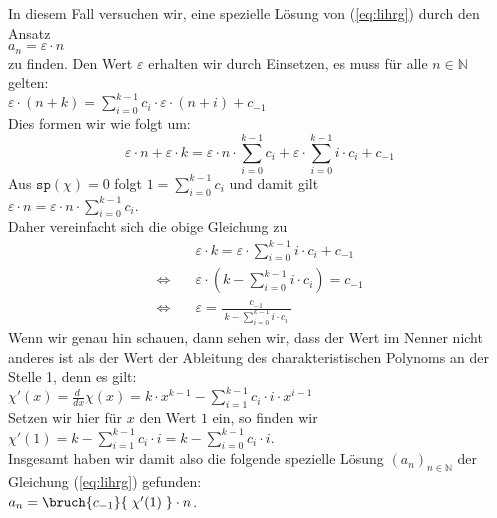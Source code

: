 \begin{enumerate}
      In diesem Fall versuchen wir, eine spezielle Lösung von (\ref{eq:lihrg}) durch den
      Ansatz \\[0.2cm]
      \hspace*{1.3cm} $a_n = \varepsilon \cdot n $ \\[0.2cm]
      zu finden.  Den Wert $\varepsilon$ erhalten wir durch Einsetzen, es muss für 
      alle $n\in\mathbb{N}$ gelten: \\[0.2cm]
      \hspace*{1.3cm} 
      $\varepsilon \cdot (n + k) = \sum\limits_{i=0}^{k-1} c_{i} \cdot \varepsilon \cdot (n + i) + c_{-1}$  
      \\[0.2cm]
      Dies formen wir wie folgt um:
      \[
        \varepsilon \cdot n + \varepsilon \cdot k = 
        \varepsilon \cdot n \cdot \sum\limits_{i=0}^{k-1} c_{i} +
        \varepsilon \cdot \sum\limits_{i=0}^{k-1} i \cdot c_{i} + c_{-1} 
      \]
      Aus  $\mathtt{sp}(\chi) = 0$ folgt $1  =  \sum\limits_{i=0}^{k-1} c_i$
      und damit gilt \\[0.2cm]
      \hspace*{1.3cm} 
      $\varepsilon \cdot n = \varepsilon \cdot n \cdot \sum\limits_{i=0}^{k-1} c_{i}$.
      \\[0.2cm]
      Daher vereinfacht sich die obige Gleichung zu 
      \[
      \begin{array}{ll}
      & \varepsilon \cdot k = \varepsilon \cdot \sum\limits_{i=0}^{k-1} i \cdot c_{i} + c_{-1} \\[0.4cm]
      \Leftrightarrow\quad 
      & \varepsilon \cdot \left(k - \sum\limits_{i=0}^{k-1} i \cdot c_{i}\right) = c_{-1} 
      \\[0.5cm]
      \Leftrightarrow\quad 
      & \varepsilon = \frac{\displaystyle c_{-1}}{\displaystyle \; k - \sum\limits_{i=0}^{k-1} i \cdot c_{i}\;} 
      \end{array}
      \]
      Wenn wir genau hin schauen, dann sehen wir, dass der Wert im Nenner nicht anderes ist
      als der Wert der Ableitung des charakteristischen Polynoms an der Stelle 1, denn es gilt: \\[0.2cm]
      \hspace*{1.3cm} 
      $\chi'(x) =\frac{d\;}{dx}\chi(x) = k \cdot x^{k-1} - \sum\limits_{i=1}^{k-1} c_{i}\cdot i \cdot x^{i-1}$
      \\[0.2cm]
      Setzen wir hier für $x$ den Wert $1$ ein, so finden wir \\[0.2cm]
      \hspace*{1.3cm} 
      $\chi'(1) = k - \sum\limits_{i=1}^{k-1} c_{i}\cdot i =  k - \sum\limits_{i=0}^{k-1} c_{i}\cdot i$. 
      \\[0.2cm]
      Insgesamt haben wir damit also die folgende spezielle Lösung $(a_n)_{n\in\mathbb{N}}$
      der Gleichung (\ref{eq:lihrg}) gefunden: \\[0.2cm]
      \hspace*{1.3cm} $a_n = \bruch{c_{-1}}{\;\chi'(1)\;}\cdot n$.


\end{enumerate}
